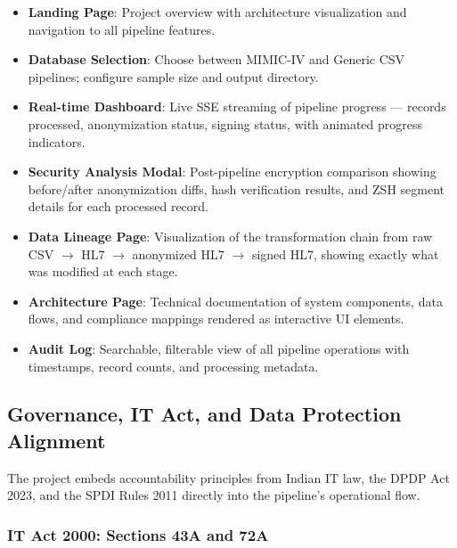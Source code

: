 \documentclass[12pt,a4paper]{report}
\begin{document}
\begin{itemize}
    \item \textbf{Landing Page}: Project overview with architecture visualization and
    navigation to all pipeline features.
    \item \textbf{Database Selection}: Choose between MIMIC-IV and Generic CSV
    pipelines; configure sample size and output directory.
    \item \textbf{Real-time Dashboard}: Live SSE streaming of pipeline progress ---
    records processed, anonymization status, signing status, with animated progress
    indicators.
    \item \textbf{Security Analysis Modal}: Post-pipeline encryption comparison
    showing before/after anonymization diffs, hash verification results, and ZSH
    segment details for each processed record.
    \item \textbf{Data Lineage Page}: Visualization of the transformation chain from
    raw CSV $\rightarrow$ HL7 $\rightarrow$ anonymized HL7 $\rightarrow$ signed HL7,
    showing exactly what was modified at each stage.
    \item \textbf{Architecture Page}: Technical documentation of system components,
    data flows, and compliance mappings rendered as interactive UI elements.
    \item \textbf{Audit Log}: Searchable, filterable view of all pipeline operations
    with timestamps, record counts, and processing metadata.
\end{itemize}

\subsection{Governance, IT Act, and Data Protection Alignment}

The project embeds accountability principles from Indian IT law, the DPDP Act 2023,
and the SPDI Rules 2011 directly into the pipeline's operational flow.

\subsubsection{IT Act 2000: Sections 43A and 72A}
\end{document}
